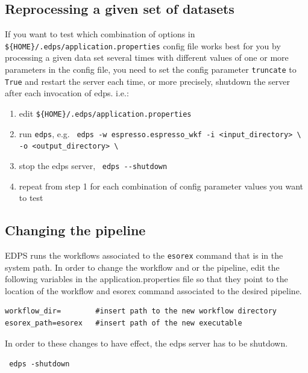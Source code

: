 
\subsection{Reprocessing a given set of datasets}
\label{sec:edps_reprocess}

If you want to test which combination of options in \verb|${HOME}/.edps/application.properties| config file works best for you by processing a given data set several times with different values of one or more parameters in the config file, you need to set the config parameter \verb|truncate| to \verb|True| and restart the server each time, or more precisely, shutdown the server after each invocation of edps. i.e.:

\begin{enumerate}
    \item edit \verb|${HOME}/.edps/application.properties|
    \item run \verb|edps|, e.g.\ \newline
    \verb|edps -w espresso.espresso_wkf -i <input_directory> \|\newline
    \verb|  -o <output_directory> \|
    \item stop the edps server,\ \newline
    \verb|edps --shutdown|
    \item repeat from step 1 for each combination of config parameter values you want to test
\end{enumerate}


\subsection{Changing the pipeline}
\label{sec:setup}
EDPS runs the workflows associated to the {\tt esorex} command that is in the system path. In order to change the workflow and or the pipeline, edit the following variables in the application.properties file so that they point to the location of the workflow and esorex command associated to the desired pipeline.
\begin{verbatim}
workflow_dir=        #insert path to the new workflow directory
esorex_path=esorex   #insert path of the new executable
\end{verbatim}

In order to these changes to have effect, the edps server has to be shutdown.

\verb| edps -shutdown|

